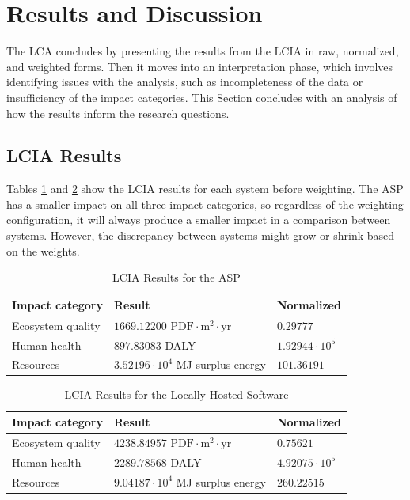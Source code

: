 \documentclass[final,journal,10pt,letterpaper,oneside,twocolumn,compsoc]%
{IEEEtran}
\begin{document}
\section{Results and Discussion}
The LCA concludes by presenting the results from the LCIA in raw, normalized,
and weighted forms. Then it moves into an interpretation phase, which
involves identifying issues with the analysis, such as incompleteness of the
data or insufficiency of the impact categories. This Section concludes with an
analysis of how the results inform the research questions.

\subsection{LCIA Results}
Tables \ref{tab:10} and \ref{tab:11} show the LCIA results for each system
before weighting. The ASP
has a smaller impact on all three impact categories, so regardless of the
weighting configuration, it will always produce a smaller impact in a
comparison between systems. However, the discrepancy between systems might grow
or shrink based on the weights.

\begin{table}[t!]
  \caption{LCIA Results for the ASP}
  \label{tab:10}
  \centering
    \begin{tabular}{| l | l | l |}
      \hline
      Impact category   & Result             & Normalized \\
      \hline
      Ecosystem quality & $1669.12200 \textrm{ PDF} \cdot \textrm{m}^2 \cdot
                          \textrm{yr}$ & $0.29777$ \\
      Human health      & $897.83083$ DALY   & $1.92944 \cdot 10^5$ \\
      Resources & $3.52196 \cdot 10^4$ MJ surplus energy & $101.36191$ \\
      \hline
    \end{tabular}
\end{table}
\begin{table}[t!]
  \caption{LCIA Results for the Locally Hosted Software}
  \label{tab:11}
  \centering
    \begin{tabular}{| l | l | l |}
      \hline
      Impact category   & Result             & Normalized \\
      \hline
      Ecosystem quality & $4238.84957 \textrm{ PDF} \cdot \textrm{m}^2
                          \cdot \textrm{yr}$ & $0.75621$ \\
      Human health      & $2289.78568$ DALY   & $4.92075 \cdot 10^5$ \\
      Resources & $9.04187 \cdot 10^4$ MJ surplus energy & $260.22515$ \\
      \hline
    \end{tabular}
\end{table}
\end{document}
